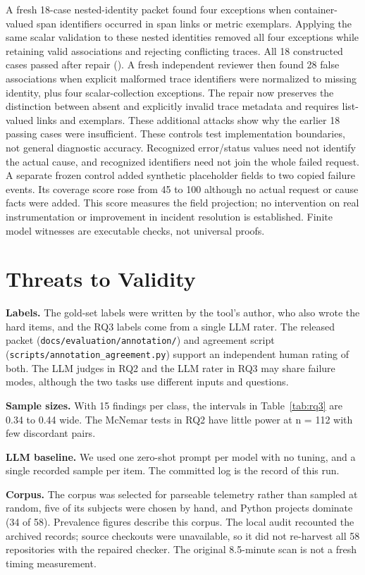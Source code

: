 \documentclass[conference]{IEEEtran}
\begin{document}
A fresh 18-case nested-identity packet found four exceptions when container-valued span identifiers occurred in span links or metric exemplars. Applying the same scalar validation to these nested identities removed all four exceptions while retaining valid associations and rejecting conflicting traces. All 18 constructed cases passed after repair (). A fresh independent reviewer then found 28 false associations when explicit malformed trace identifiers were normalized to missing identity, plus four scalar-collection exceptions. The repair now preserves the distinction between absent and explicitly invalid trace metadata and requires list-valued links and exemplars. These additional attacks show why the earlier 18 passing cases were insufficient. These controls test implementation boundaries, not general diagnostic accuracy. Recognized error/status values need not identify the actual cause, and recognized identifiers need not join the whole failed request. A separate frozen control added synthetic placeholder fields to two copied failure events. Its coverage score rose from 45 to 100 although no actual request or cause facts were added. This score measures the field projection; no intervention on real instrumentation or improvement in incident resolution is established. Finite model witnesses are executable checks, not universal proofs.

\section{Threats to Validity}

\textbf{Labels.} The gold-set labels were written by the tool's author, who also wrote the hard items, and the RQ3 labels come from a single LLM rater. The released packet (\texttt{docs/evaluation/annotation/}) and agreement script (\texttt{scripts/annotation\_agreement.py}) support an independent human rating of both. The LLM judges in RQ2 and the LLM rater in RQ3 may share failure modes, although the two tasks use different inputs and questions.

\textbf{Sample sizes.} With 15 findings per class, the intervals in Table~\ref{tab:rq3} are 0.34 to 0.44 wide. The McNemar tests in RQ2 have little power at n = 112 with few discordant pairs.

\textbf{LLM baseline.} We used one zero-shot prompt per model with no tuning, and a single recorded sample per item. The committed log is the record of this run.

\textbf{Corpus.} The corpus was selected for parseable telemetry rather than sampled at random, five of its subjects were chosen by hand, and Python projects dominate (34 of 58). Prevalence figures describe this corpus. The local audit recounted the archived records; source checkouts were unavailable, so it did not re-harvest all 58 repositories with the repaired checker. The original 8.5-minute scan is not a fresh timing measurement.
\end{document}
